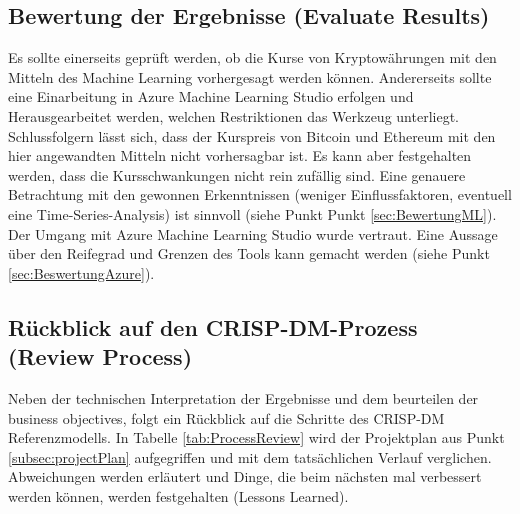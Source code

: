 \subsection*{Bewertung der Ergebnisse (Evaluate Results)} \label{subsec:revRes}
Es sollte einerseits geprüft werden, ob die Kurse von Kryptowährungen mit den Mitteln des Machine Learning vorhergesagt werden können. Andererseits sollte eine Einarbeitung in Azure Machine Learning Studio erfolgen und Herausgearbeitet werden, welchen Restriktionen das Werkzeug unterliegt.
Schlussfolgern lässt sich, dass der Kurspreis von Bitcoin und Ethereum mit den hier angewandten Mitteln nicht vorhersagbar ist. Es kann aber festgehalten werden, dass die Kursschwankungen nicht rein zufällig sind. Eine genauere Betrachtung mit den gewonnen Erkenntnissen (weniger Einflussfaktoren, eventuell eine Time-Series-Analysis) ist sinnvoll (siehe Punkt Punkt \ref{sec:BewertungML}).
Der Umgang mit Azure Machine Learning Studio wurde vertraut. Eine Aussage über den Reifegrad und Grenzen des Tools kann gemacht werden (siehe Punkt \ref{sec:BeswertungAzure}).

\subsection*{Rückblick auf den CRISP-DM-Prozess (Review Process)}
Neben der technischen Interpretation der Ergebnisse und dem beurteilen der business objectives, folgt ein Rückblick auf die Schritte des CRISP-DM Referenzmodells.
In Tabelle \ref{tab:ProcessReview} wird der Projektplan aus Punkt \ref{subsec:projectPlan} aufgegriffen und mit dem tatsächlichen Verlauf verglichen. Abweichungen werden erläutert und Dinge, die beim nächsten mal verbessert werden können, werden festgehalten (Lessons Learned).

